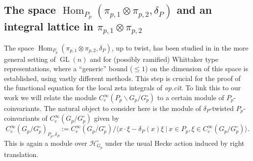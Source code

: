 \documentclass{amsart}%
\theoremstyle{plain}
\theoremstyle{plain}
\theoremstyle{remark}
\DeclareMathOperator{\GL}{GL}
\DeclareMathOperator{\Hom}{Hom}
\begin{document}
\subsection{The space $\Hom_{P_p}(\pi_{p,1}\otimes\pi_{p,2},\delta_P)$ and an integral lattice in $\pi_{p,1}\otimes\pi_{p,2}$}\label{sec relation to l-modular}
The space $\Hom_{P_p}(\pi_{p,1}\otimes \pi_{p,2},\delta_P)$, up to twist, has been studied in \cite{jacquet1983rankin} in the more general setting of $\GL(n)$ and for (possibly ramified) Whittaker type representations, where a ``generic'' bound ($\leq 1$) on the dimension of this space is established, using vastly different methods. This step is crucial for the proof of the functional equation for the local zeta integrals of \textit{op.cit}. To link this to our work we will relate the module $C_c^\infty(P_p\backslash G_p/G_p^\circ)$ to a certain module of $P_p$-coinvariants. The natural object to consider here is the module of $\delta_P$-twisted $P_p$-coinvariants of $C_c^\infty(G_p/G_p^\circ)$ given by 
$$C_c^\infty(G_p/G_p^\circ)_{P_p,\delta_P}:=C_c^\infty(G_p/G_p^\circ)/\langle x\cdot\xi-\delta_P(x)\xi\ |\ x\in P_p,\xi\in C_c^\infty(G_p/G_p^\circ)\rangle.$$
This is again a module over $\mathcal{H}_{G_p}^\circ$ under the usual Hecke action induced by right translation.
\end{document}
